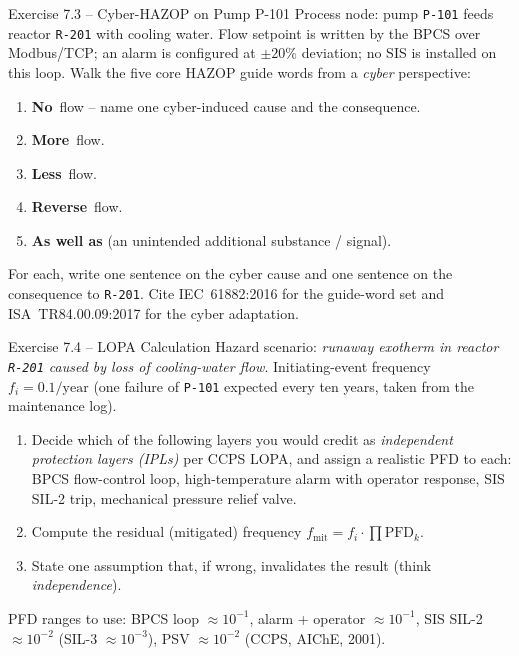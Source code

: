 \documentclass[11pt,a4paper]{article}
\begin{document}
\begin{taskbox}{Exercise 7.3 -- Cyber-HAZOP on Pump P-101}
Process node: pump \texttt{P-101} feeds reactor \texttt{R-201} with cooling
water. Flow setpoint is written by the BPCS over Modbus/TCP; an alarm is
configured at $\pm 20\%$ deviation; no SIS is installed on this loop.
Walk the five core HAZOP guide words from a \emph{cyber} perspective:
\begin{enumerate}
  \item \textbf{No}~flow -- name one cyber-induced cause and the consequence.
  \item \textbf{More}~flow.
  \item \textbf{Less}~flow.
  \item \textbf{Reverse}~flow.
  \item \textbf{As well as} (an unintended additional substance / signal).
\end{enumerate}
For each, write one sentence on the cyber cause and one sentence on the
consequence to \texttt{R-201}. Cite IEC~61882:2016 for the guide-word set
and ISA~TR84.00.09:2017 for the cyber adaptation.
\end{taskbox}

\begin{taskbox}{Exercise 7.4 -- LOPA Calculation}
Hazard scenario: \emph{runaway exotherm in reactor \texttt{R-201} caused by
loss of cooling-water flow}. Initiating-event frequency
$f_i = 0.1/\text{year}$ (one failure of \texttt{P-101} expected every
ten years, taken from the maintenance log).
\begin{enumerate}
  \item Decide which of the following layers you would credit as
        \emph{independent protection layers (IPLs)} per CCPS LOPA, and assign
        a realistic PFD to each:
        BPCS flow-control loop, high-temperature alarm with operator
        response, SIS SIL-2 trip, mechanical pressure relief valve.
  \item Compute the residual (mitigated) frequency
        $f_\text{mit} = f_i \cdot \prod \text{PFD}_k$.
  \item State one assumption that, if wrong, invalidates the result
        (think \emph{independence}).
\end{enumerate}
PFD ranges to use: BPCS loop $\approx 10^{-1}$, alarm + operator
$\approx 10^{-1}$, SIS SIL-2 $\approx 10^{-2}$ (SIL-3 $\approx 10^{-3}$),
PSV $\approx 10^{-2}$ (CCPS, AIChE, 2001).
\end{taskbox}
\end{document}

